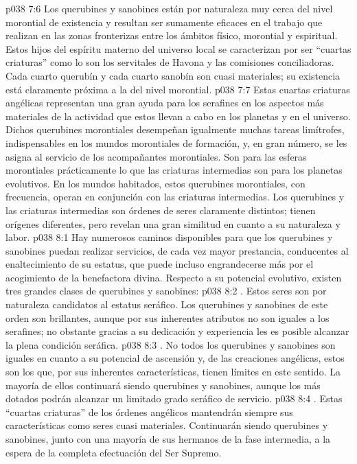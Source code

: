 \vs p038 7:6 \pc Los querubines y sanobines están por naturaleza muy cerca del nivel morontial de existencia y resultan ser sumamente eficaces en el trabajo que realizan en las zonas fronterizas entre los ámbitos físico, morontial y espiritual. Estos hijos del espíritu materno del universo local se caracterizan por ser “cuartas criaturas” como lo son los servitales de Havona y las comisiones conciliadoras. Cada cuarto querubín y cada cuarto sanobín son cuasi materiales; su existencia está claramente próxima a la del nivel morontial.
\vs p038 7:7 Estas cuartas criaturas angélicas representan una gran ayuda para los serafines en los aspectos más materiales de la actividad que estos llevan a cabo en los planetas y en el universo. Dichos querubines morontiales desempeñan igualmente muchas tareas limítrofes, indispensables en los mundos morontiales de formación, y, en gran número, se les asigna al servicio de los acompañantes morontiales. Son para las esferas morontiales prácticamente lo que las criaturas intermedias son para los planetas evolutivos. En los mundos habitados, estos querubines morontiales, con frecuencia, operan en conjunción con las criaturas intermedias. Los querubines y las criaturas intermedias son órdenes de seres claramente distintos; tienen orígenes diferentes, pero revelan una gran similitud en cuanto a su naturaleza y labor.
\vs p038 8:1 Hay numerosos caminos disponibles para que los querubines y sanobines puedan realizar servicios, de cada vez mayor prestancia, conducentes al enaltecimiento de su estatus, que puede incluso engrandecerse más por el acogimiento de la benefactora divina. Respecto a su potencial evolutivo, existen tres grandes clases de querubines y sanobines:
\vs p038 8:2 . Estos seres son por naturaleza candidatos al estatus seráfico. Los querubines y sanobines de este orden son brillantes, aunque por sus inherentes atributos no son iguales a los serafines; no obstante gracias a su dedicación y experiencia les es posible alcanzar la plena condición seráfica.
\vs p038 8:3 . No todos los querubines y sanobines son iguales en cuanto a su potencial de ascensión y, de las creaciones angélicas, estos son los que, por sus inherentes características, tienen límites en este sentido. La mayoría de ellos continuará siendo querubines y sanobines, aunque los más dotados podrán alcanzar un limitado grado seráfico de servicio.
\vs p038 8:4 . Estas “cuartas criaturas” de los órdenes angélicos mantendrán siempre sus características como seres cuasi materiales. Continuarán siendo querubines y sanobines, junto con una mayoría de sus hermanos de la fase intermedia, a la espera de la completa efectuación del Ser Supremo.
